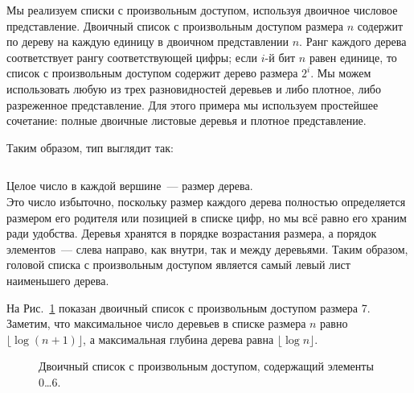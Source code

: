 \begin{frame}[fragile]{}
Мы реализуем списки с произвольным доступом, используя двоичное
числовое представление. Двоичный список с произвольным доступом
размера $n$ содержит по дереву на каждую единицу в двоичном
представлении $n$. Ранг каждого дерева соответствует рангу
соответствующей цифры; если $i$-й бит $n$ равен единице, то список с
произвольным доступом содержит дерево размера $2^i$. Мы можем
использовать любую из трех разновидностей деревьев и либо плотное,
либо разреженное представление. Для этого примера мы используем
простейшее сочетание: полные двоичные листовые деревья и плотное
представление. 
\end{frame}

\begin{frame}[fragile]{}
Таким образом, тип  выглядит так:

\inputminted[firstline=7,lastline=9]{haskell}{code/BinaryRandomAccessList.lhs}

Целое число в каждой вершине~--- размер дерева. \\

Это число
избыточно, поскольку размер каждого дерева полностью определяется
размером его родителя или позицией в списке цифр, но мы всё равно его
храним ради удобства. Деревья хранятся в порядке возрастания размера,
а порядок элементов~--- слева направо, как внутри, так и между
деревьями. Таким образом, головой списка с произвольным доступом
является самый левый лист наименьшего дерева. 
\end{frame}

\begin{frame}[fragile]{}
На Рис.~\ref{fig:9.5}
показан двоичный список с произвольным доступом размера 7. Заметим,
что максимальное число деревьев в списке размера $n$ равно
$\lfloor \log (n+1) \rfloor$, а максимальная глубина дерева равна
$\lfloor \log n \rfloor$.



\begin{figure}
  \centering
  
  \caption{Двоичный список с произвольным доступом, содержащий элементы 0\ldots 6.}
  \label{fig:9.5}
\end{figure}
\end{frame}

